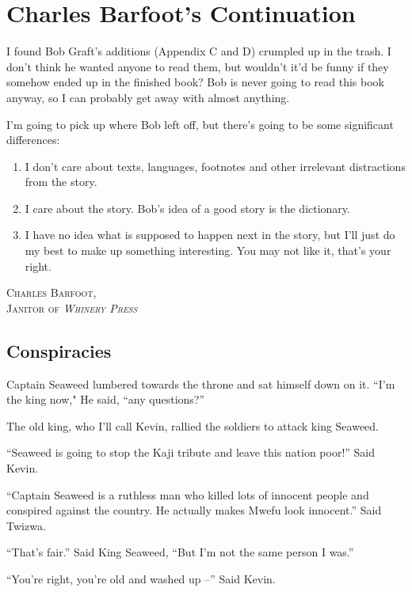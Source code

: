 \chapter{Charles Barfoot's Continuation}
I found Bob Graft's additions (Appendix C and D) crumpled up in the trash. I don't think he wanted anyone to read them, but wouldn't it'd be funny if they somehow ended up in the finished book? Bob is never going to read this book anyway, so I can probably get away with almost anything.

I'm going to pick up where Bob left off, but there's going to be some significant differences:
\begin{enumerate}
\item I don't care about texts, languages, footnotes and other irrelevant distractions from the story.
\item I care about the story. Bob's idea of a good story is the dictionary.
\item I have no idea what is supposed to happen next in the story, but I'll just do my best to make up something interesting. You may not like it, that's your right.
\end{enumerate}

\begin{flushright}
\textsc{
Charles Barfoot,\\
Janitor of \emph{Whinery Press}}
\end{flushright}

\clearpage

\section{Conspiracies}

Captain Seaweed lumbered towards the throne and sat himself down on it.
``I'm the king now," He said, ``any questions?''

The old king, who I'll call Kevin, rallied the soldiers to attack king Seaweed.

``Seaweed is going to stop the Ka\-ji tribute and leave this nation poor!'' Said Kevin.

``Captain Seaweed is a ruthless man who killed lots of innocent people and conspired against the country. He actually makes Mwe\-fu look innocent.'' Said Twi\-zwa.

``That's fair.'' Said King Seaweed, ``But I'm not the same person I was.''

``You're right, you're old and washed up --'' Said Kevin.

